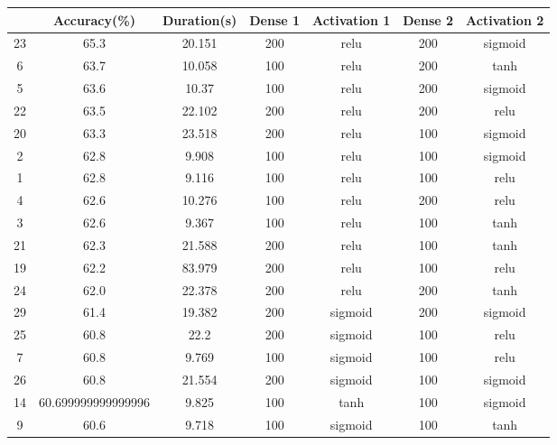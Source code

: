\begin{table}[h]
\centering
\begin{tabular}{@{}ccccccc@{}}
\toprule
   & Accuracy(\%)       & Duration(s) & Dense 1 & Activation 1 & Dense 2 & Activation 2 \\ \midrule
23 & 65.3               & 20.151      & 200     & relu         & 200     & sigmoid      \\
6  & 63.7               & 10.058      & 100     & relu         & 200     & tanh         \\
5  & 63.6               & 10.37       & 100     & relu         & 200     & sigmoid      \\
22 & 63.5               & 22.102      & 200     & relu         & 200     & relu         \\
20 & 63.3               & 23.518      & 200     & relu         & 100     & sigmoid      \\
2  & 62.8               & 9.908       & 100     & relu         & 100     & sigmoid      \\
1  & 62.8               & 9.116       & 100     & relu         & 100     & relu         \\
4  & 62.6               & 10.276      & 100     & relu         & 200     & relu         \\
3  & 62.6               & 9.367       & 100     & relu         & 100     & tanh         \\
21 & 62.3               & 21.588      & 200     & relu         & 100     & tanh         \\
19 & 62.2               & 83.979      & 200     & relu         & 100     & relu         \\
24 & 62.0               & 22.378      & 200     & relu         & 200     & tanh         \\
29 & 61.4               & 19.382      & 200     & sigmoid      & 200     & sigmoid      \\
25 & 60.8               & 22.2        & 200     & sigmoid      & 100     & relu         \\
7  & 60.8               & 9.769       & 100     & sigmoid      & 100     & relu         \\
26 & 60.8               & 21.554      & 200     & sigmoid      & 100     & sigmoid      \\
14 & 60.699999999999996 & 9.825       & 100     & tanh         & 100     & sigmoid      \\
9  & 60.6               & 9.718       & 100     & sigmoid      & 100     & tanh         \\

\end{tabular}
\end{table}

